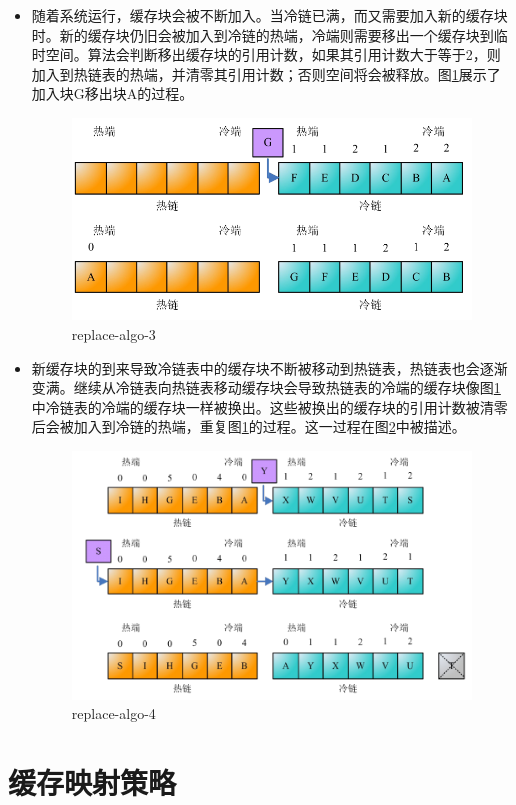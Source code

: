 \begin{enumerate}
\begin{itemize}
\item
随着系统运行，缓存块会被不断加入。当冷链已满，而又需要加入新的缓存块时。新的缓存块仍旧会被加入到冷链的热端，冷端则需要移出一个缓存块到临时空间。算法会判断移出缓存块的引用计数，如果其引用计数大于等于2，则加入到热链表的热端，并清零其引用计数；否则空间将会被释放。图\ref{fig:replace-algo-3}展示了加入块G移出块A的过程。
\begin{figure}
\centering
\includegraphics[width=0.6\linewidth]{./graph/replace-algo-3}
\caption{replace-algo-3}
\label{fig:replace-algo-3}
\end{figure}

\item
新缓存块的到来导致冷链表中的缓存块不断被移动到热链表，热链表也会逐渐变满。继续从冷链表向热链表移动缓存块会导致热链表的冷端的缓存块像图\ref{fig:replace-algo-3}中冷链表的冷端的缓存块一样被换出。这些被换出的缓存块的引用计数被清零后会被加入到冷链的热端，重复图\ref{fig:replace-algo-3}的过程。这一过程在图\ref{fig:replace-algo-4}中被描述。
\begin{figure}
\centering
\includegraphics[width=0.7\linewidth]{./graph/replace-algo-4}
\caption{replace-algo-4}
\label{fig:replace-algo-4}
\end{figure}
\end{itemize}

\end{enumerate}

\section{缓存映射策略}
\label{sec:cache_mapping}

